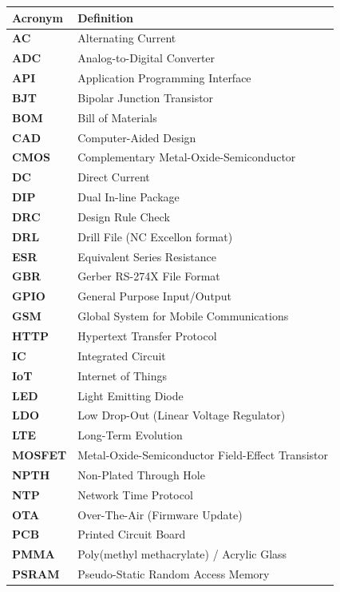 \documentclass[12pt,a4paper,oneside]{report}
\begin{document}
\begin{table}[H]
\centering
\begin{tabular}{ll}
\toprule
\textbf{Acronym} & \textbf{Definition} \\
\midrule
\textbf{AC} & Alternating Current \\
\textbf{ADC} & Analog-to-Digital Converter \\
\textbf{API} & Application Programming Interface \\
\textbf{BJT} & Bipolar Junction Transistor \\
\textbf{BOM} & Bill of Materials \\
\textbf{CAD} & Computer-Aided Design \\
\textbf{CMOS} & Complementary Metal-Oxide-Semiconductor \\
\textbf{DC} & Direct Current \\
\textbf{DIP} & Dual In-line Package \\
\textbf{DRC} & Design Rule Check \\
\textbf{DRL} & Drill File (NC Excellon format) \\
\textbf{ESR} & Equivalent Series Resistance \\
\textbf{GBR} & Gerber RS-274X File Format \\
\textbf{GPIO} & General Purpose Input/Output \\
\textbf{GSM} & Global System for Mobile Communications \\
\textbf{HTTP} & Hypertext Transfer Protocol \\
\textbf{IC} & Integrated Circuit \\
\textbf{IoT} & Internet of Things \\
\textbf{LED} & Light Emitting Diode \\
\textbf{LDO} & Low Drop-Out (Linear Voltage Regulator) \\
\textbf{LTE} & Long-Term Evolution \\
\textbf{MOSFET} & Metal-Oxide-Semiconductor Field-Effect Transistor \\
\textbf{NPTH} & Non-Plated Through Hole \\
\textbf{NTP} & Network Time Protocol \\
\textbf{OTA} & Over-The-Air (Firmware Update) \\
\textbf{PCB} & Printed Circuit Board \\
\textbf{PMMA} & Poly(methyl methacrylate) / Acrylic Glass \\
\textbf{PSRAM} & Pseudo-Static Random Access Memory \\

\end{tabular}
\end{table}
\end{document}
